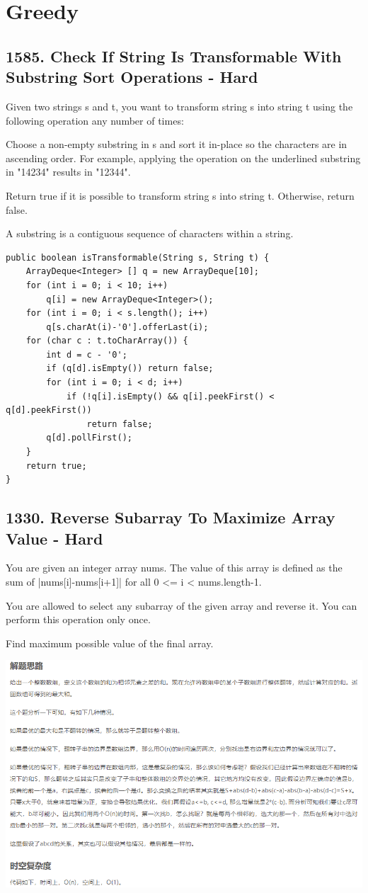 \documentclass[9pt, b5paaper]{book}
\begin{document}
\chapter{Greedy}
\label{sec-21}
\section{1585. Check If String Is Transformable With Substring Sort Operations - Hard}
\label{sec-21-1}
Given two strings s and t, you want to transform string s into string t using the following operation any number of times:

Choose a non-empty substring in s and sort it in-place so the characters are in ascending order.
For example, applying the operation on the underlined substring in "14234" results in "12344".

Return true if it is possible to transform string s into string t. Otherwise, return false.

A substring is a contiguous sequence of characters within a string.
\begin{verbatim}
public boolean isTransformable(String s, String t) { 
    ArrayDeque<Integer> [] q = new ArrayDeque[10];
    for (int i = 0; i < 10; i++) 
        q[i] = new ArrayDeque<Integer>();
    for (int i = 0; i < s.length(); i++) 
        q[s.charAt(i)-'0'].offerLast(i);
    for (char c : t.toCharArray()) {
        int d = c - '0';
        if (q[d].isEmpty()) return false;
        for (int i = 0; i < d; i++) 
            if (!q[i].isEmpty() && q[i].peekFirst() < q[d].peekFirst())
                return false;
        q[d].pollFirst();
    }
    return true;
}
\end{verbatim}

\section{1330. Reverse Subarray To Maximize Array Value - Hard}
\label{sec-21-2}
You are given an integer array nums. The value of this array is defined as the sum of |nums[i]-nums[i+1]| for all 0 <= i < nums.length-1.

You are allowed to select any subarray of the given array and reverse it. You can perform this operation only once.

Find maximum possible value of the final array.

\includegraphics[width=.9\linewidth]{./pic/reverseSubarray.png}
\end{document}
